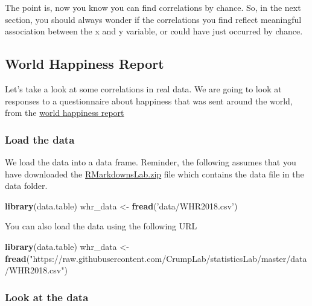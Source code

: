 \documentclass[]{book}
\newenvironment{Shaded}{\begin{snugshade}}{\end{snugshade}}
\newcommand{\KeywordTok}[1]{\textcolor[rgb]{0.13,0.29,0.53}{\textbf{#1}}}
\newcommand{\StringTok}[1]{\textcolor[rgb]{0.31,0.60,0.02}{#1}}
\newcommand{\NormalTok}[1]{#1}
\begin{document}
The point is, now you know you can find correlations by chance. So, in
the next section, you should always wonder if the correlations you find
reflect meaningful association between the x and y variable, or could
have just occurred by chance.

\subsection{World Happiness Report}\label{world-happiness-report}

Let's take a look at some correlations in real data. We are going to
look at responses to a questionnaire about happiness that was sent
around the world, from the \href{http://worldhappiness.report}{world
happiness report}

\subsubsection{Load the data}\label{load-the-data}

We load the data into a data frame. Reminder, the following assumes that
you have downloaded the
\href{https://github.com/CrumpLab/statisticsLab/raw/master/RMarkdownsLab.zip}{RMarkdownsLab.zip}
file which contains the data file in the data folder.

\begin{Shaded}
\begin{Highlighting}[]
\KeywordTok{library}\NormalTok{(data.table)}
\NormalTok{whr_data <-}\StringTok{ }\KeywordTok{fread}\NormalTok{(}\StringTok{'data/WHR2018.csv'}\NormalTok{)}
\end{Highlighting}
\end{Shaded}

You can also load the data using the following URL

\begin{Shaded}
\begin{Highlighting}[]
\KeywordTok{library}\NormalTok{(data.table)}
\NormalTok{whr_data <-}\StringTok{ }\KeywordTok{fread}\NormalTok{(}\StringTok{"https://raw.githubusercontent.com/CrumpLab/statisticsLab/master/data/WHR2018.csv"}\NormalTok{)}
\end{Highlighting}
\end{Shaded}

\subsubsection{Look at the data}\label{look-at-the-data-1}
\end{document}
